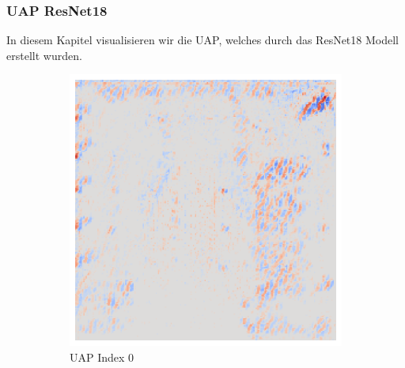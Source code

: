 \subsubsection{UAP ResNet18}
In diesem Kapitel visualisieren wir die UAP, welches durch das ResNet18 Modell erstellt wurden.

\begin{figure}[ht!]
    \centering
    \begin{subfigure}{0.19\linewidth}
        \centering
        \includegraphics[height=1\linewidth]{01-images/05-resultate/uap_resnet/uap0-resnet18-covid-n200-robustificationslevel0.png}
        \caption{UAP Index 0}
    \end{subfigure}\hfill%
    \begin{subfigure}{0.19\linewidth}
        \centering

\end{subfigure}
\end{figure}
